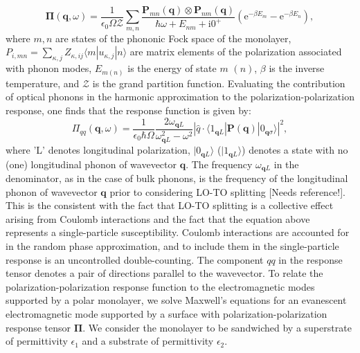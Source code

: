 \documentclass[aps,prb,twocolumn,
groupedaddress,superscriptaddress,
amsfonts,amssymb,amsmath,floatfix,
citeautoscript]{revtex4-1}
\newcommand{\iu}{\mathrm{i}}
\newcommand{\e}{\mathrm{e}}
\begin{document}
	\begin{equation}\label{eq:2dsusceptibility}
	\boldsymbol{\Pi}(\mathbf{q},\omega) =  \frac{1}{\epsilon_0 \Omega\mathcal{Z}}\sum\limits_{m,n}\frac{\mathbf{P}_{mn}(\mathbf{q})\otimes\mathbf{P}_{nm}(\mathbf{q})}{\hbar\omega + E_{nm}+\iu 0^+}\left(\e^{-\beta E_m}-\e^{-\beta E_n} \right),
	\end{equation}
	where $m,n$ are states of the phononic Fock space of the monolayer, $P_{i,mn} = \sum\limits_{\kappa,j}Z_{\kappa,ij}\langle m | u_{\kappa,j} | n \rangle$ are matrix elements of the polarization associated with phonon modes, $E_{m (n)}$ is the energy of state $m$ $(n)$, $\beta$ is the inverse temperature, and $\mathcal{Z}$ is the grand partition function. Evaluating the contribution of optical phonons in the harmonic approximation to the polarization-polarization response, one finds that the response function is given by: 
	\begin{equation}
	\Pi_{qq}(\mathbf{q},\omega) = \frac{1}{\epsilon_0\hbar\Omega} \frac{2\omega_{\mathbf{q}L}}{\omega^2_{\mathbf{q}L}-\omega^2}|\hat{q}\cdot\langle 1_{\mathbf{q}L}|\mathbf{P}(\mathbf{q})|0_{\mathbf{q}\sigma}\rangle|^2,
	\end{equation}
	where 'L' denotes longitudinal polarization, $|0_{\mathbf{q}L}\rangle$ ($|1_{\mathbf{q}L}\rangle$) denotes a state with no (one) longitudinal phonon of wavevector $\mathbf{q}$. The frequency $\omega_{\mathbf{q}L}$ in the denominator, as in the case of bulk phonons, is the frequency of the longitudinal phonon of wavevector $\mathbf{q}$ prior to considering LO-TO splitting [Needs reference!]. This is the consistent with the fact that LO-TO splitting is a collective effect arising from Coulomb interactions and the fact that the equation above represents a single-particle susceptibility. Coulomb interactions are accounted for in the random phase approximation, and to include them in the single-particle response is an uncontrolled double-counting. The component $qq$ in the response tensor denotes a pair of directions parallel to the wavevector.  To relate the polarization-polarization response function to the electromagnetic modes supported by a polar monolayer, we solve Maxwell's equations for an evanescent electromagnetic mode supported by a surface with polarization-polarization response tensor $\mathbf{\Pi}$. We consider the monolayer to be sandwiched by a superstrate of permittivity $\epsilon_1$ and a substrate of permittivity $\epsilon_2$.
	
\end{document}
